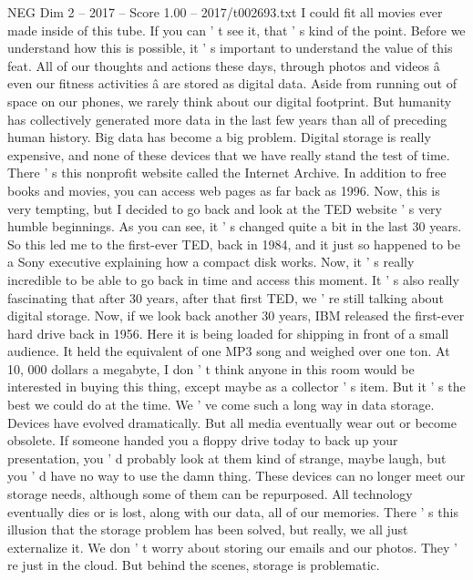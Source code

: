 \begin{textsample}{NEG Dim 2 – 2017 – Score 1.00 – 2017/t002693.txt}  \label{ex:f2_neg_051}
I could fit all movies ever made inside of this tube.
If you can ' t see it, that ' s kind of the point.
Before we understand how this is possible, it ' s important to understand the value of this feat.
All of our thoughts and actions these days, through photos and videos â even our fitness activities â are stored as digital data.
Aside from running out of space on our phones, we rarely think about our digital footprint.
But humanity has collectively generated more data in the last few years than all of preceding human history.
Big data has become a big problem.
Digital storage is really expensive, and none of these devices that we have really stand the test of time.
There ' s this nonprofit website called the Internet Archive.
In addition to free books and movies, you can access web pages as far back as 1996.
Now, this is very tempting, but I decided to go back and look at the TED website ' s very humble beginnings.
As you can see, it ' s changed quite a bit in the last 30 years.
So this led me to the first-ever TED, back in 1984, and it just so happened to be a Sony executive explaining how a compact disk works.
Now, it ' s really incredible to be able to go back in time and access this moment.
It ' s also really fascinating that after 30 years, after that first TED, we ' re still talking about digital storage.
Now, if we look back another 30 years, IBM released the first-ever hard drive back in 1956.
Here it is being loaded for shipping in front of a small audience.
It held the equivalent of one MP3 song and weighed over one ton.
At 10, 000 dollars a megabyte, I don ' t think anyone in this room would be interested in buying this thing, except maybe as a collector ' s item.
But it ' s the best we could do at the time.
We ' ve come such a long way in data storage.
Devices have evolved dramatically.
But all media eventually wear out or become obsolete.
If someone handed you a floppy drive today to back up your presentation, you ' d probably look at them kind of strange, maybe laugh, but you ' d have no way to use the damn thing.
These devices can no longer meet our storage needs, although some of them can be repurposed.
All technology eventually dies or is lost, along with our data, all of our memories.
There ' s this illusion that the storage problem has been solved, but really, we all just externalize it.
We don ' t worry about storing our emails and our photos.
They ' re just in the cloud.
But behind the scenes, storage is problematic.

\end{textsample}
